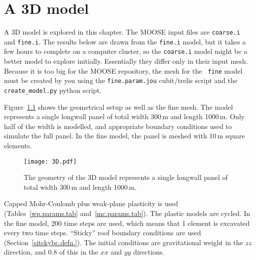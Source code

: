 \documentclass[]{scrreprt}
\begin{document}
\chapter{A 3D model}

A 3D model is explored in this chapter.  The MOOSE input files are
{\tt coarse.i} and {\tt fine.i}.  The results below are drawn from the
{\tt fine.i} model, but it takes a few hours to complete on a computer
cluster, so the {\tt coarse.i} model might be a better model to
explore initially.  Essentially they differ only in their input mesh.
Because it is too big for the MOOSE repository, the mesh for the {\tt
  fine} model must be created by you using the {\tt fine.param.jou}
cubit/trelis script and the {\tt create\_model.py} python script.

Figure~\ref{3D.fig} shows the geometrical setup as well as the fine
mesh.  The model represents  a single longwall
panel of total width 300\,m and length 1000\,m.  Only half of the
width is modelled, and appropriate boundary conditions used to
simulate the full panel.  In the fine model, the panel is meshed with
10\,m square elements.

\begin{figure}[htb]
\centering
\texttt{[image: 3D.pdf]}
\caption{\label{3D.fig}The geometry of the 3D model represents a single longwall
  panel of total width 300\,m and length 1000\,m.}
\end{figure}

Capped Mohr-Coulomb plus weak-plane plasticity is used
(Tables~\ref{wp.params.tab} and~\ref{mc.params.tab}).  The plastic
models are cycled.  In the fine model, 200 time steps are used, which
means that 1 element is excavated every two time steps.  ``Sticky''
roof boundary conditions are used (Section~\ref{sitckybc.defn.}).  The
initial conditions are gravitational weight in the $zz$ direction, and
0.8 of this in the $xx$ and $yy$ directions.
\end{document}
